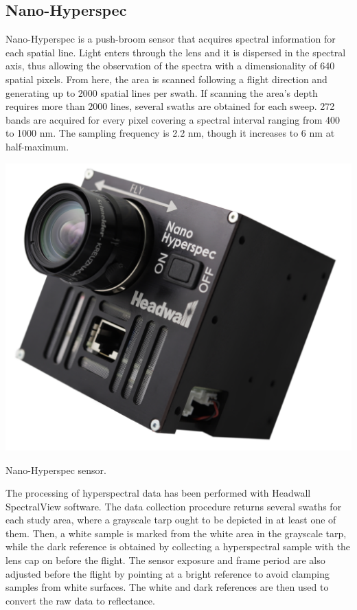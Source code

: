 \subsection{Nano-Hyperspec}

Nano-Hyperspec is a push-broom sensor that acquires spectral information for each spatial line. Light enters through the lens and it is dispersed in the spectral axis, thus allowing the observation of the spectra with a dimensionality of 640 spatial pixels. From here, the area is scanned following a flight direction and generating up to 2000 spatial lines per swath. If scanning the area's depth requires more than 2000 lines, several swaths are obtained for each sweep. 272 bands are acquired for every pixel covering a spectral interval ranging from 400 to 1000 \si{\nano\meter}. The sampling frequency is 2.2 \si{\nano\meter}, though it increases to 6 \si{\nano\meter} at half-maximum.

\begin{marginfigure}[-3.0cm]
	\includegraphics{figs/materials/nano_hyperspec.png}
	\caption{Nano-Hyperspec sensor.}
	\label{fig:nano_hyperspec}
\end{marginfigure}

The processing of hyperspectral data has been performed with Headwall SpectralView\texttrademark \hspace{1mm} software. The data collection procedure returns several swaths for each study area, where a grayscale tarp ought to be depicted in at least one of them. Then, a white sample is marked from the white area in the grayscale tarp, while the dark reference is obtained by collecting a hyperspectral sample with the lens cap on before the flight. The sensor exposure and frame period are also adjusted before the flight by pointing at a bright reference to avoid clamping samples from white surfaces. The white and dark references are then used to convert the raw data to reflectance. 

